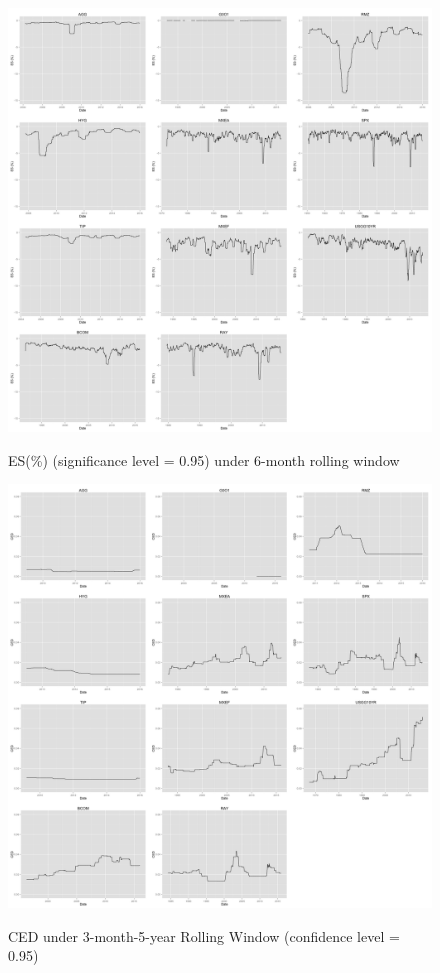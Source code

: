 \documentclass[12pt]{article}
\begin{document}
\begin{figure}[h]
\caption{ES(\%) (significance level = 0.95) under 6-month rolling window} 
\centering 
\includegraphics[width=15cm]{../results/ES6mon_scaled}
\label{fig: ES6mon}
\end{figure}

\begin{figure}[h]
\caption{CED under 3-month-5-year Rolling Window (confidence level = 0.95)} 
\centering 
\includegraphics[width=15cm]{../results/CED_3mon_5yr_95}
\label{fig: CED3mon5yr95}
\end{figure}
\end{document}

